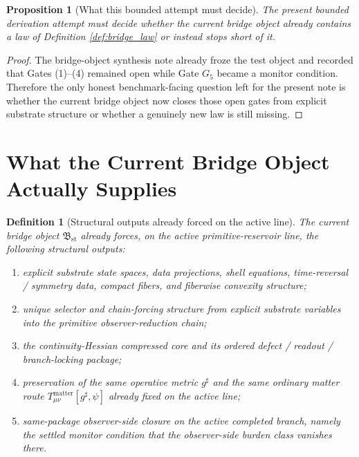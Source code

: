 \documentclass[11pt]{article}
\newcommand{\StableBridgeObject}{\mathfrak B_{\mathrm{st}}}
\newcommand{\ObserverMetric}{g^{\sharp}}
\newcommand{\GateFive}{G_{5}}
\newtheorem{definition}{Definition}
\newtheorem{proposition}{Proposition}
\begin{document}
\begin{proposition}[What this bounded attempt must decide]
\label{prop:decision}
The present bounded derivation attempt must decide whether the current bridge object already contains a law of Definition \ref{def:bridge_law} or instead stops short of it.
\end{proposition}

\begin{proof}
The bridge-object synthesis note already froze the test object and recorded that Gates (1)--(4) remained open while Gate \(\GateFive\) became a monitor condition. Therefore the only honest benchmark-facing question left for the present note is whether the current bridge object now closes those open gates from explicit substrate structure or whether a genuinely new law is still missing.
\end{proof}

\section{What the Current Bridge Object Actually Supplies}

\begin{definition}[Structural outputs already forced on the active line]
\label{def:forced_outputs}
The current bridge object \(\StableBridgeObject\) already forces, on the active primitive-reservoir line, the following structural outputs:
\begin{enumerate}
    \item explicit substrate state spaces, data projections, shell equations, time-reversal / symmetry data, compact fibers, and fiberwise convexity structure;
    \item unique selector and chain-forcing structure from explicit substrate variables into the primitive observer-reduction chain;
    \item the continuity-Hessian compressed core and its ordered defect / readout / branch-locking package;
    \item preservation of the same operative metric \(\ObserverMetric\) and the same ordinary matter route \(T_{\mu\nu}^{\mathrm{matter}}[\ObserverMetric,\psi]\) already fixed on the active line;
    \item same-package observer-side closure on the active completed branch, namely the settled monitor condition that the observer-side burden class vanishes there.
\end{enumerate}
\end{definition}
\end{document}
